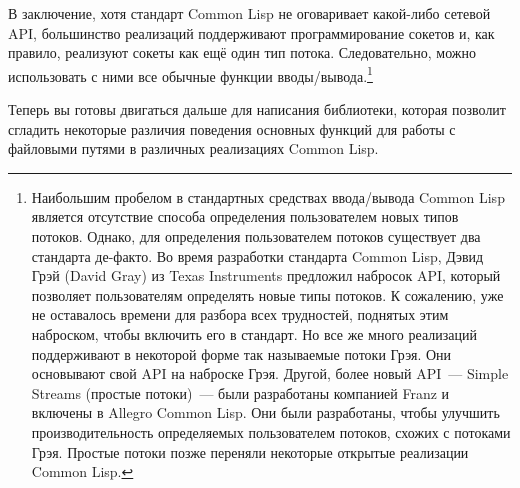 В заключение, хотя стандарт Common Lisp не оговаривает какой-либо сетевой API, большинство
реализаций поддерживают программирование сокетов и, как правило, реализуют сокеты как ещё
один тип потока. Следовательно, можно использовать с ними все обычные функции
вводы/вывода.\footnote{Наибольшим пробелом в стандартных средствах ввода/вывода Common
  Lisp является отсутствие способа определения пользователем новых типов потоков. Однако,
  для определения пользователем потоков существует два стандарта де-факто. Во время
  разработки стандарта Common Lisp, Дэвид Грэй (David Gray) из Texas Instruments предложил
  набросок API, который позволяет пользователям определять новые типы потоков. К
  сожалению, уже не оставалось времени для разбора всех трудностей, поднятых этим
  наброском, чтобы включить его в стандарт. Но все же много реализаций поддерживают в
  некоторой форме так называемые потоки Грэя. Они основывают свой API на наброске
  Грэя. Другой, более новый API~--- Simple Streams (простые потоки)~--- были разработаны
  компанией Franz и включены в Allegro Common Lisp. Они были разработаны, чтобы улучшить
  производительность определяемых пользователем потоков, схожих с потоками Грэя. Простые
  потоки позже переняли некоторые открытые реализации Common Lisp.}

Теперь вы готовы двигаться дальше для написания библиотеки, которая позволит сгладить
некоторые различия поведения основных функций для работы с файловыми путями в различных
реализациях Common Lisp.

